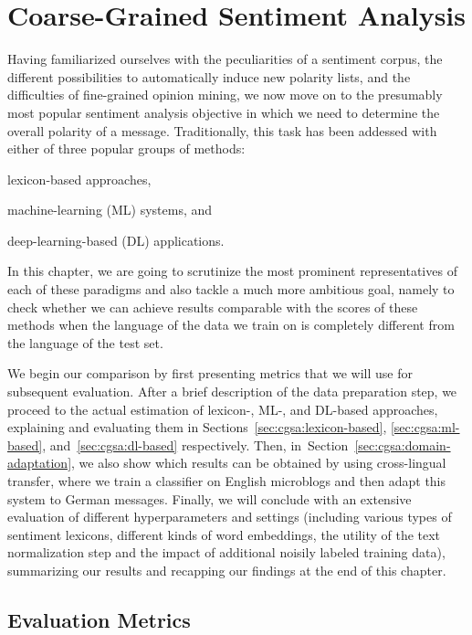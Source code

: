\chapter{Coarse-Grained Sentiment Analysis}\label{sec:snt:cgsa}

Having familiarized ourselves with the peculiarities of a sentiment
corpus, the different possibilities to automatically induce new
polarity lists, and the difficulties of fine-grained opinion mining,
we now move on to the presumably most popular sentiment analysis
objective in which we need to determine the overall polarity of a
message.  Traditionally, this task has been addessed with either of
three popular groups of methods:
\begin{inparaenum}[(i)]
  \item lexicon-based approaches,
  \item machine-learning (ML) systems, and
  \item deep-learning-based (DL) applications.
\end{inparaenum}
In this chapter, we are going to scrutinize the most prominent
representatives of each of these paradigms and also tackle a much more
ambitious goal, namely to check whether we can achieve results
comparable with the scores of these methods when the language of the
data we train on is completely different from the language of the test
set.

We begin our comparison by first presenting metrics that we will use
for subsequent evaluation.  After a brief description of the data
preparation step, we proceed to the actual estimation of lexicon-,
ML-, and DL-based approaches, explaining and evaluating them in
Sections~\ref{sec:cgsa:lexicon-based}, \ref{sec:cgsa:ml-based},
and~\ref{sec:cgsa:dl-based} respectively.  Then,
in~Section~\ref{sec:cgsa:domain-adaptation}, we also show which
results can be obtained by using cross-lingual transfer, where we
train a classifier on English microblogs and then adapt this system to
German messages.  Finally, we will conclude with an extensive
evaluation of different hyperparameters and settings (including
various types of sentiment lexicons, different kinds of word
embeddings, the utility of the text normalization step and the impact
of additional noisily labeled training data), summarizing our results
and recapping our findings at the end of this chapter.

\section{Evaluation Metrics}\label{sec:cgsa:eval-metrics}

